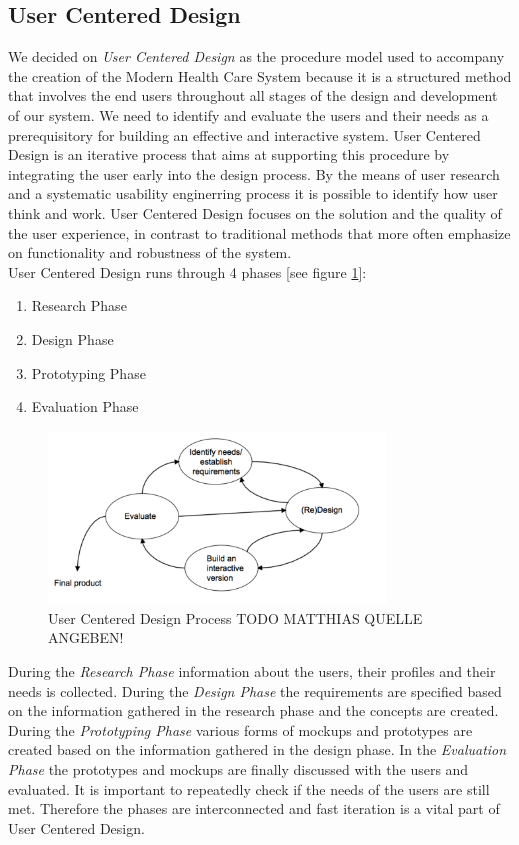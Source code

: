 \documentclass[a4paper,11pt]{article}
\begin{document}
\subsection{User Centered Design}
\label{subsect:ucd}
We decided on \emph{User Centered Design} as the procedure model used to accompany the creation of the Modern Health Care System because it is a structured method that involves the end users throughout all stages of the design and development of our system. We need to identify and evaluate the users and their needs as a prerequisitory for building an effective and interactive system. User Centered Design is an iterative process that aims at supporting this procedure by integrating the user early into the design process. By the means of user research and a systematic usability enginerring process it is possible to identify how user think and work. User Centered Design focuses on the solution and the quality of the user experience, in contrast to traditional methods that more often emphasize on functionality and robustness of the system. \\

User Centered Design runs through 4 phases [see figure \ref{fig:UCD}]:

\begin{enumerate}
	\item Research Phase
	\item Design Phase
	\item Prototyping Phase
	\item Evaluation Phase
\end{enumerate}

\begin{figure}[htb]
	\centering
		\includegraphics[width=0.8\textwidth]{images/method/UCD.pdf}
	\caption{User Centered Design Process TODO MATTHIAS QUELLE ANGEBEN!}
	\label{fig:UCD}
\end{figure}

During the \emph{Research Phase} information about the users, their profiles and their needs is collected. During the \emph{Design Phase} the requirements are specified based on the information gathered in the research phase and the concepts are created. During the \emph{Prototyping Phase} various forms of mockups and prototypes are created based on the information gathered in the design phase. In the \emph{Evaluation Phase} the prototypes and mockups are finally discussed with the users and evaluated. It is important to repeatedly check if the needs of the users are still met. Therefore the phases are interconnected and fast iteration is a vital part of User Centered Design.
\end{document}

